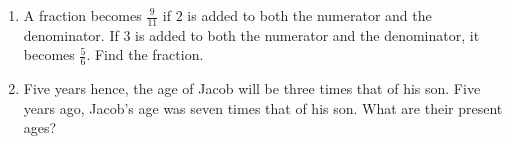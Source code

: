 \begin{enumerate}
\begin{enumerate}[label=(\Roman*)]
    \item A fraction becomes $\frac{9}{11}$ if $2$ is added to both the numerator and the denominator. If $3$ is added to both the numerator and the denominator, it becomes $\frac{5}{6}$. Find the fraction.
    \item Five years hence, the age of Jacob will be three times that of his son. Five years ago, Jacob's age was seven times that of his son. What are their present ages?
    \end{enumerate}
\end{enumerate}

